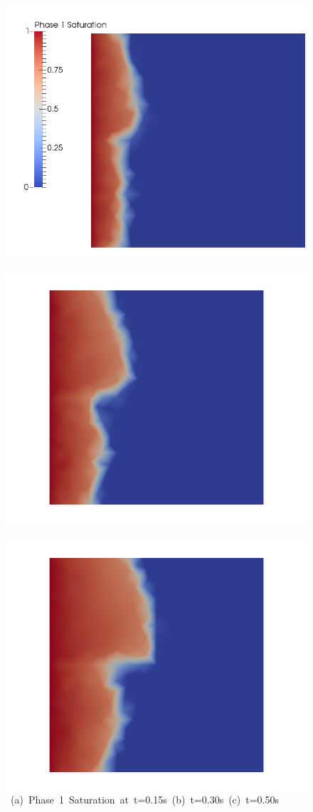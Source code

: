 \begin{landscape}
\begin{figure}[ht] 
\vbox{\vspace{-1cm}
\hbox{\includegraphics[width=.56\textwidth]{./Pics/SVDCase/SVDCase_Saturation_t_dot15.png}
      \includegraphics[width=.56\textwidth]{./Pics/SVDCase/SVDCase_Saturation_t_dot30.png}
      \includegraphics[width=.56\textwidth]{./Pics/SVDCase/SVDCase_Saturation_t_dot50.png}}
\vspace{0.cm}
\hbox{\hspace{0.5cm} (a) Phase 1 Saturation at t=0.15s \hspace{3.75cm} (b) t=0.30s \hspace{5.0cm} (c) t=0.50s}
\vspace{0.5cm}
}
\end{figure}
\end{landscape}

